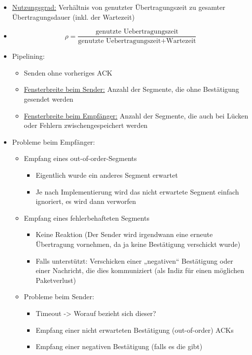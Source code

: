 \begin{itemize}
    \item \underline{Nutzungsgrad:} Verhältnis von genutzter Übertragungszeit zu gesamter Übertragungsdauer (inkl. der Wartezeit)
    \item \[\rho = \frac{\textrm{genutzte Uebertragungszeit}}{\textrm{genutzte Uebertragungszeit} + \textrm{Wartezeit}}\]
\end{itemize}

\begin{itemize}
    \item Pipelining:
    \begin{itemize}
        \item Senden ohne vorheriges ACK
        \item \underline{Fensterbreite beim Sender:} Anzahl der Segmente, die ohne Bestätigung gesendet werden
        \item \underline{Fensterbreite beim Empfänger:} Anzahl der Segmente, die auch bei Lücken oder Fehlern zwischengespeichert werden
    \end{itemize}
    \item Probleme beim Empfänger:
    \begin{itemize}
        \item Empfang eines out-of-order-Segments
        \begin{itemize}
            \item Eigentlich wurde ein anderes Segment erwartet
            \item Je nach Implementierung wird das nicht erwartete Segment einfach ignoriert, es wird dann verworfen
        \end{itemize}
        \item Empfang eines fehlerbehafteten Segments
        \begin{itemize}
            \item Keine Reaktion (Der Sender wird irgendwann eine erneute Übertragung vornehmen, da ja keine Bestätigung verschickt wurde)
            \item Falls unterstützt: Verschicken einer „negativen“ Bestätigung oder einer Nachricht, die dies kommuniziert (als Indiz für einen möglichen Paketverlust)
        \end{itemize}
        \item Probleme beim Sender:
        \begin{itemize}
            \item Timeout -> Worauf bezieht sich dieser?
            \item Empfang einer nicht erwarteten Bestätigung (out-of-order) ACKs
            \item Empfang einer negativen Bestätigung (falls es die gibt)
        \end{itemize}
    \end{itemize}
\end{itemize}


